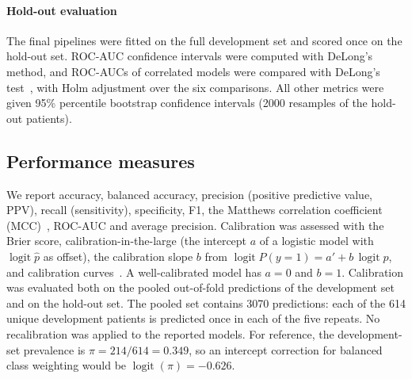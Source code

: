 \paragraph{Hold-out evaluation}
The final pipelines were fitted on the full development set and scored once on the hold-out set. ROC-AUC confidence intervals were computed with DeLong's method, and ROC-AUCs of correlated models were compared with DeLong's test~\cite{delong1988,sun2014delong}, with Holm adjustment over the six comparisons. All other metrics were given 95\% percentile bootstrap confidence intervals (2000 resamples of the hold-out patients).

\subsection{Performance measures}
We report accuracy, balanced accuracy, precision (positive predictive value, PPV), recall (sensitivity), specificity, F1, the Matthews correlation coefficient (MCC)~\cite{chicco2020mcc}, ROC-AUC and average precision. Calibration was assessed with the Brier score, calibration-in-the-large (the intercept $a$ of a logistic model with $\operatorname{logit}\hat p$ as offset), the calibration slope $b$ from $\operatorname{logit} P(y=1) = a' + b\,\operatorname{logit}\hat p$, and calibration curves~\cite{vancalster2019calibration}. A well-calibrated model has $a = 0$ and $b = 1$. Calibration was evaluated both on the pooled out-of-fold predictions of the development set and on the hold-out set. The pooled set contains 3070 predictions: each of the 614 unique development patients is predicted once in each of the five repeats. No recalibration was applied to the reported models. For reference, the development-set prevalence is $\pi = 214/614 = 0.349$, so an intercept correction for balanced class weighting would be $\operatorname{logit}(\pi) = -0.626$.

